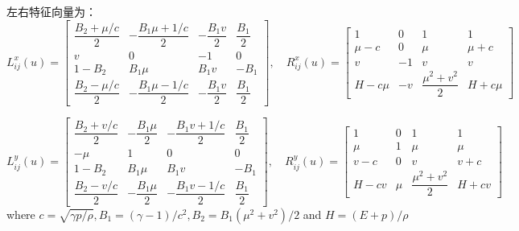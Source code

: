 \documentclass{book}
\begin{document}
左右特征向量为\cite{RN95}：
\begin{equation}
    L_{i j}^{x}(u)=\begin{bmatrix}
        \dfrac{B_{2}+\mu / c}{2} & -\dfrac{B_{1} \mu+1 / c}{2} & -\dfrac{B_{1} v}{2} & \dfrac{B_{1}}{2} \\
        v                        & 0                           & -1                  & 0                \\
        1-B_{2}                  & B_{1} \mu                   & B_{1} v             & -B_{1}           \\
        \dfrac{B_{2}-\mu / c}{2} & -\dfrac{B_{1} \mu-1 / c}{2} & -\dfrac{B_{1} v}{2} & \dfrac{B_{1}}{2}
    \end{bmatrix},\quad
    R_{i j}^{x}(u)=\begin{bmatrix}
        1       & 0  & 1                        & 1       \\
        \mu-c   & 0  & \mu                      & \mu+c   \\
        v       & -1 & v                        & v       \\
        H-c \mu & -v & \dfrac{\mu^{2}+v^{2}}{2} & H+c \mu
    \end{bmatrix}
\end{equation}

\begin{equation}
    L_{i j}^{y}(u)=\begin{bmatrix}
        \dfrac{B_{2}+v / c}{2} & -\dfrac{B_{1} \mu}{2} & -\dfrac{B_{1} v+1 / c}{2} & \dfrac{B_{1}}{2} \\
        -\mu                   & 1                     & 0                         & 0                \\
        1-B_{2}                & B_{1} \mu             & B_{1} v                   & -B_{1}           \\
        \dfrac{B_{2}-v / c}{2} & -\dfrac{B_{1} \mu}{2} & -\dfrac{B_{1} v-1 / c}{2} & \dfrac{B_{1}}{2}
    \end{bmatrix},\quad
    R_{i j}^{y}(u)=\begin{bmatrix}
        1     & 0   & 1                        & 1     \\
        \mu   & 1   & \mu                      & \mu   \\
        v-c   & 0   & v                        & v+c   \\
        H-c v & \mu & \dfrac{\mu^{2}+v^{2}}{2} & H+c v
    \end{bmatrix}
\end{equation}
where  $c=\sqrt{\gamma p / \rho}, B_{1}=(\gamma-1) / c^{2}, B_{2}=B_{1}\left(\mu^{2}+v^{2}\right) / 2$  and  $H=(E+p) / \rho$
\end{document}
